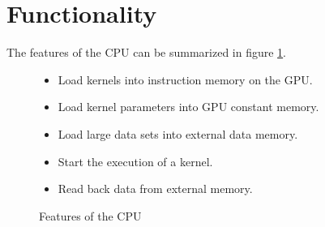 \documentclass[../main/report.tex]{subfiles}
\begin{document}
\section{Functionality}

The features of the CPU can be summarized in figure \ref{fig:cpu_features}.

\begin{figure}[H]
    \begin{itemize}
      \item Load kernels into instruction memory on the GPU.
      \item Load kernel parameters into GPU constant memory.
      \item Load large data sets into external data memory.
      \item Start the execution of a kernel.
      \item Read back data from external memory.
    \end{itemize}
    \caption{Features of the CPU}
    \label{fig:cpu_features}
\end{figure}
\end{document}
